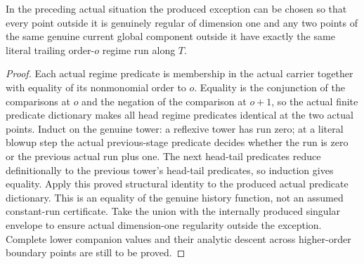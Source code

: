 \begin{corollary}
\label{hir:curve-predicates-actual-run}
\leanok
In the preceding actual situation the produced exception can be chosen so
that every point outside it is genuinely regular of dimension one and any two points of the same genuine current global component outside
it have exactly the same literal trailing order-$o$ regime run along $T$.
\end{corollary}
\begin{proof}
Each actual regime predicate is membership in the actual carrier together
with equality of its nonmonomial order to $o$. Equality is the conjunction
of the comparisons at $o$ and the negation of the comparison at $o+1$,
so the actual finite predicate dictionary makes all head regime predicates
identical at the two actual points. Induct on the genuine tower: a reflexive
tower has run zero; at a literal blowup step the actual previous-stage
predicate decides whether the run is zero or the previous actual run plus
one. The next head-tail predicates reduce definitionally to the previous
tower's head-tail predicates, so induction gives equality. Apply this proved
structural identity to the produced actual predicate dictionary. This is
an equality of the genuine history function, not an assumed constant-run
certificate. Take the union with the internally produced singular envelope to ensure
actual dimension-one regularity outside the exception. Complete lower companion values and their analytic descent
across higher-order boundary points are still to be proved.
\end{proof}

